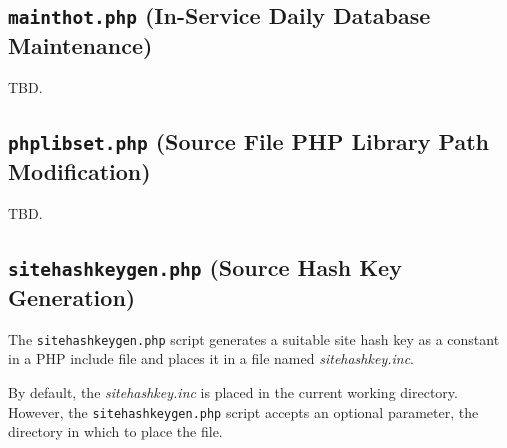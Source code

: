 \documentclass[letterpaper,10pt,titlepage]{article}
\begin{document}

\subsection{\texttt{mainthot.php} (In-Service Daily Database Maintenance)}
\label{ssas0:smah0}

TBD.


\subsection{\texttt{phplibset.php} (Source File PHP Library Path Modification)}
\label{ssas0:sphl0}

TBD.


\subsection{\texttt{sitehashkeygen.php} (Source Hash Key Generation)}
\label{ssas0:shkg0}

The \texttt{sitehashkeygen.php}
script generates a suitable site hash key as a constant in a PHP include file
and places it in a file named \emph{sitehashkey.inc}.

By default, the \emph{sitehashkey.inc} is placed in the current working directory.
However, the \texttt{sitehashkeygen.php} script accepts an optional parameter,
the directory in which to place the file.
\end{document}
